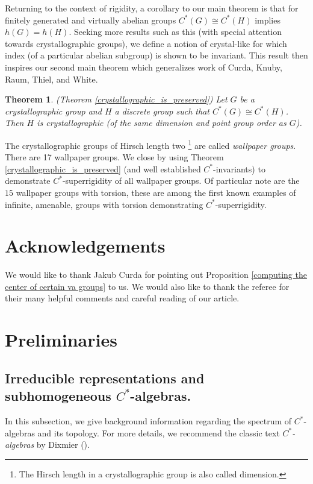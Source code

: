 \documentclass[11pt, twoside]{amsart}
\newtheorem{thm}{Theorem}[section]
\theoremstyle{definition}
\renewcommand{\thethm}{\Alph{thm}}  %
\newcommand{\str}{\texorpdfstring}
\begin{document}
Returning to the context of rigidity, a corollary to our main theorem is that for finitely generated and virtually abelian groups $C^*(G)\cong C^*(H)$ implies $h(G)=h(H)$. Seeking more results such as this (with special attention towards crystallographic groups), we define a notion of crystal-like for which index (of a particular abelian subgroup) is shown to be invariant. This result then inspires our second main theorem which generalizes work of Curda, Knuby, Raum, Thiel, and White. 

\begin{thm} (Theorem \ref{crystallographic_is_preserved})
Let $G$ be a crystallographic group and $H$ a discrete group such that $C^*(G)\cong C^*(H)$. Then $H$ is crystallographic (of the same dimension and point group order as $G$).
\end{thm}

The crystallographic groups of Hirsch length two \footnote{The Hirsch length in a crystallographic group is also called dimension.} are called \emph{wallpaper groups}. There are 17 wallpaper groups. We close by using Theorem \ref{crystallographic_is_preserved} (and well established $C^*$-invariants) to demonstrate $C^*$-superrigidity of all wallpaper groups. Of particular note are the $15$ wallpaper groups with torsion, these are among the first known examples of infinite, amenable, groups with torsion demonstrating $C^*$-superrigidity.

\section*{Acknowledgements}
We would like to thank Jakub Curda for pointing out Proposition \ref{computing the center of certain va groups} to us. We would also like to thank the referee for their many helpful comments and careful reading of our article.



\section{Preliminaries}

\renewcommand{\thethm}{\thesection.\arabic{thm}}

\subsection{Irreducible representations and subhomogeneous \str{$C^*$}{C*}-algebras.}

In this subsection, we give background information regarding the spectrum of $C^*$-algebras and its topology. For more details, we recommend the classic text {\em $C^*$-algebras} by Dixmier (\cite{Dix77}).
\end{document}
